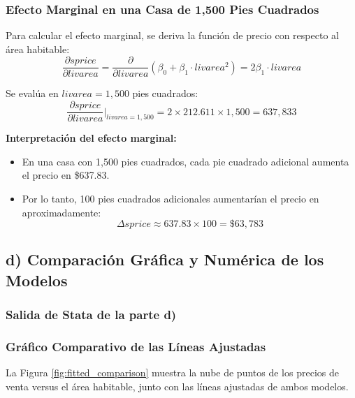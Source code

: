 \documentclass[12pt]{article}
\begin{document}
\subsubsection*{Efecto Marginal en una Casa de 1,500 Pies Cuadrados}

Para calcular el efecto marginal, se deriva la función de precio con respecto al área habitable:
\[
\frac{\partial sprice}{\partial livarea} = \frac{\partial}{\partial livarea}(\beta_0 + \beta_1 \cdot livarea^2) = 2\beta_1 \cdot livarea
\]

Se evalúa en $livarea = 1,500$ pies cuadrados:
\[
\frac{\partial sprice}{\partial livarea}\bigg|_{livarea=1,500} = 2 \times 212.611 \times 1,500 = 637,833
\]

\textbf{Interpretación del efecto marginal:}
\begin{itemize}
    \item En una casa con 1,500 pies cuadrados, cada pie cuadrado adicional aumenta el precio en \$637.83.
    \item Por lo tanto, 100 pies cuadrados adicionales aumentarían el precio en aproximadamente:
    \[
    \Delta sprice \approx 637.83 \times 100 = \boxed{\$63,783}
    \]
\end{itemize}

\subsection*{d) Comparación Gráfica y Numérica de los Modelos}

\subsubsection*{Salida de Stata de la parte d)}



\subsubsection*{Gráfico Comparativo de las Líneas Ajustadas}

La Figura \ref{fig:fitted_comparison} muestra la nube de puntos de los precios de venta versus el área habitable, junto con las líneas ajustadas de ambos modelos.
\end{document}
